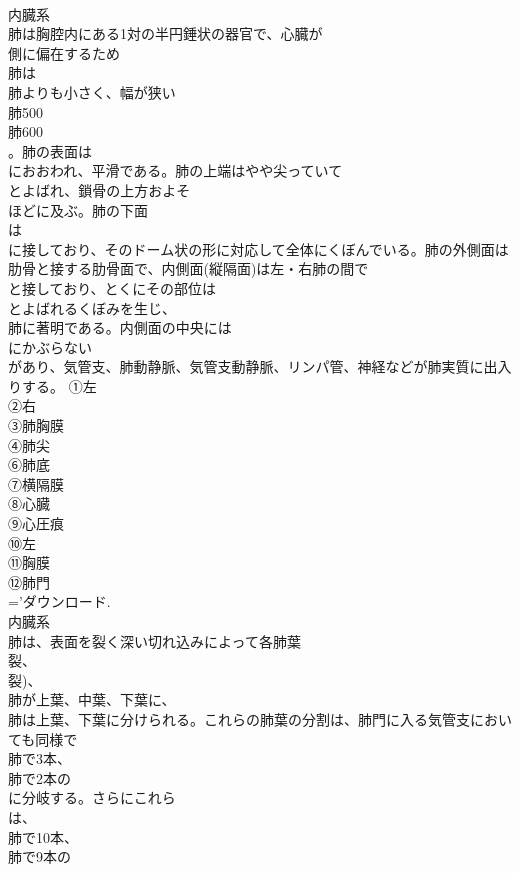 \documentclass[8pt]{extreport}
\begin{document}
\begin{CJK}{UTF8}{min}
\\	内臓系
\\	肺は胸腔内にある1対の半円錘状の器官で、心臓が
\\	側に偏在するため
\\	肺は
\\	肺よりも小さく、幅が狭い
\\	肺500
\\	肺600
\\	。肺の表面は
\\	におおわれ、平滑である。肺の上端はやや尖っていて
\\	とよばれ、鎖骨の上方およそ
\\	ほどに及ぶ。肺の下面
\\	は
\\	に接しており、そのドーム状の形に対応して全体にくぼんでいる。肺の外側面は肋骨と接する肋骨面で、内側面(縦隔面)は左・右肺の間で
\\	と接しており、とくにその部位は
\\	とよばれるくぼみを生じ、
\\	肺に著明である。内側面の中央には
\\	にかぶらない
\\	があり、気管支、肺動静脈、気管支動静脈、リンパ管、神経などが肺実質に出入りする。	①左
\\	②右
\\	③肺胸膜
\\	④肺尖
\\	⑥肺底
\\	⑦横隔膜
\\	⑧心臓
\\	⑨心圧痕
\\	⑩左
\\	⑪胸膜
\\	⑫肺門
\\	='ダウンロード.
\\	内臓系
\\	肺は、表面を裂く深い切れ込みによって各肺葉
\\	裂、
\\	裂)、
\\	肺が上葉、中葉、下葉に、
\\	肺は上葉、下葉に分けられる。これらの肺葉の分割は、肺門に入る気管支においても同様で
\\	肺で3本、
\\	肺で2本の
\\	に分岐する。さらにこれら
\\	は、
\\	肺で10本、
\\	肺で9本の

\end{CJK}
\end{document}
